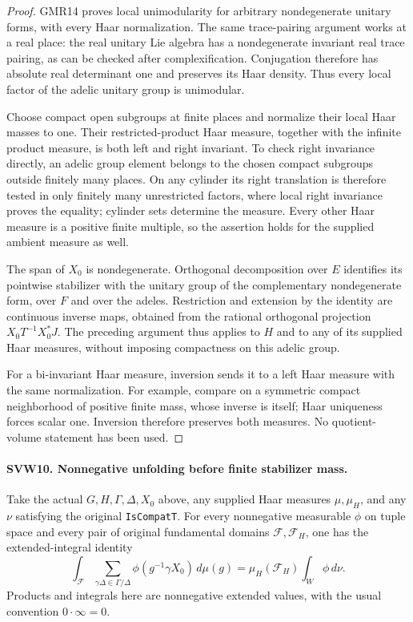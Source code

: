 \documentclass[11pt,a4paper]{article}
\numberwithin{equation}{section}
\theoremstyle{remark}\newtheorem{remark}[theorem]{Remark}
\begin{document}
\begin{proof}
GMR14 proves local unimodularity for arbitrary nondegenerate
unitary forms, with every Haar normalization.  The same trace-pairing
argument works at a real place: the real unitary Lie algebra has a
nondegenerate invariant real trace pairing, as can be checked after
complexification.  Conjugation therefore has absolute real
determinant one and preserves its Haar density.  Thus every local
factor of the adelic unitary group is unimodular.

Choose compact open subgroups at finite places and normalize their
local Haar masses to one.  Their restricted-product Haar measure,
together with the infinite product measure, is both left and right
invariant.  To check right invariance directly, an adelic group
element belongs to the chosen compact subgroups outside finitely
many places.  On any cylinder its right translation is therefore
tested in only finitely many unrestricted factors, where local
right invariance proves the equality; cylinder sets determine the
measure.  Every other Haar measure is a positive finite multiple,
so the assertion holds for the supplied ambient measure as well.

The span of $X_0$ is nondegenerate.  Orthogonal decomposition over
$E$ identifies its pointwise stabilizer with the unitary group of
the complementary nondegenerate form, over $F$ and over the adeles.
Restriction and extension by the identity are continuous inverse
maps, obtained from the rational orthogonal projection
$X_0T^{-1}X_0^*J$.  The preceding argument thus applies to $H$ and
to any of its supplied Haar measures, without imposing compactness
on this adelic group.

For a bi-invariant Haar measure, inversion sends it to a left Haar
measure with the same normalization.  For example, compare on a
symmetric compact neighborhood of positive finite mass, whose
inverse is itself; Haar uniqueness forces scalar one.  Inversion
therefore preserves both measures.  No quotient-volume statement
has been used.
\end{proof}

\paragraph{SVW10. Nonnegative unfolding before finite stabilizer mass.}
\label{claim:SVW10}
Take the actual $G,H,\Gamma,\Delta,X_0$ above, any supplied Haar
measures $\mu,\mu_H$, and any $\nu$ satisfying the original
\texttt{Is\allowbreak Compat\allowbreak T}.  For every nonnegative measurable $\phi$ on
tuple space and every pair of original fundamental domains
$\mathcal F,\mathcal F_H$, one has the extended-integral identity
\[
 \int_{\mathcal F}\sum_{\gamma\Delta\in\Gamma/\Delta}
               \phi(g^{-1}\gamma X_0)\,d\mu(g)
             =\mu_H(\mathcal F_H)\int_W\phi\,d\nu.
 \tag{SVW.18}
\]
Products and integrals here are nonnegative extended values,
with the usual convention $0\cdot\infty=0$.
\end{document}
